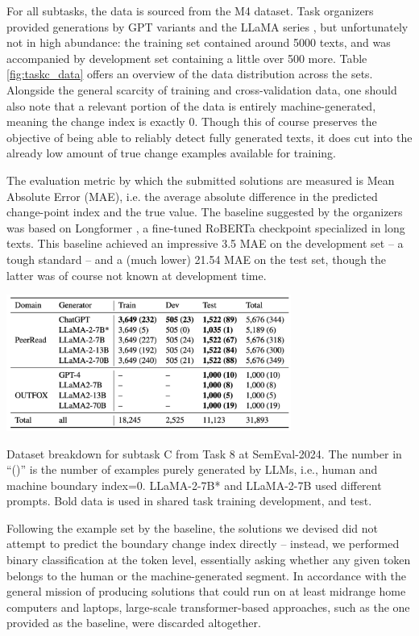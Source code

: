 For all subtasks, the data is sourced from the M4 \citep{wang-etal-2024-m4} dataset.
Task organizers provided generations by GPT variants and the LLaMA series \citep{touvron2023llama}, but unfortunately not in high abundance: the training set contained around 5000 texts, and was accompanied by development set containing a little over 500 more.
Table \ref{fig:taskc_data} offers an overview of the data distribution across the sets.
Alongside the general scarcity of training and cross-validation data, one should also note that a relevant portion of the data is entirely machine-generated, meaning the change index is exactly 0.
Though this of course preserves the objective of being able to reliably detect fully generated texts, it does cut into the already low amount of true change examples available for training.

The evaluation metric by which the submitted solutions are measured is Mean Absolute Error (MAE), i.e. the average absolute difference in the predicted change-point index and the true value.
The baseline suggested by the organizers was based on Longformer \citep{beltagy2020longformerlongdocumenttransformer}, a fine-tuned RoBERTa checkpoint specialized in long texts.
This baseline achieved an impressive 3.5 MAE on the development set -- a tough standard -- and a (much lower) 21.54 MAE on the test set, though the latter was of course not known at development time.


\begin{table}[ht]
    \centering
    \includegraphics[width=0.7\textwidth]{assets/subtaskc-data.png}
    \caption{
        Dataset breakdown for subtask C from Task 8 at SemEval-2024.
        The number in “()” is the number of examples purely generated by LLMs, i.e., human and machine boundary index=0.
        LLaMA-2-7B* and LLaMA-2-7B used different prompts. Bold data is used in shared task training development, and test.
    }
    \label{fig:taskc_data}
\end{table}

Following the example set by the baseline, the solutions we devised did not attempt to predict the boundary change index directly -- instead, we performed binary classification at the token level, essentially asking whether any given token belongs to the human or the machine-generated segment.
In accordance with the general mission of producing solutions that could run on at least midrange home computers and laptops, large-scale transformer-based approaches, such as the one provided as the baseline, were discarded altogether.

